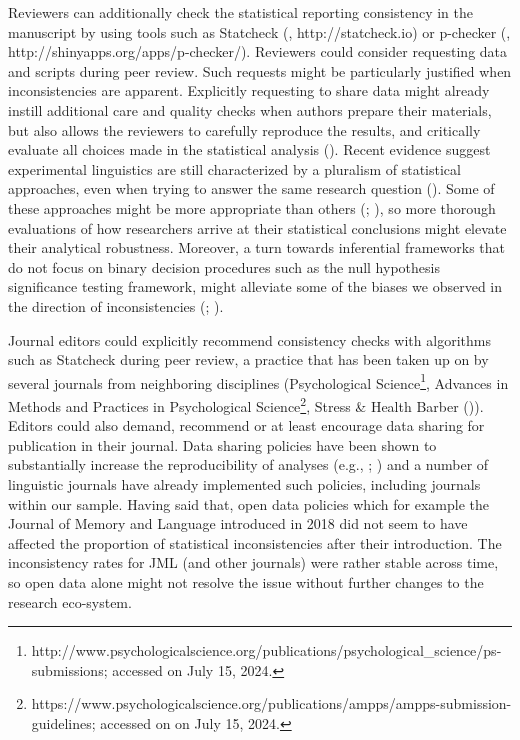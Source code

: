 \documentclass[
  doc,
  longtable,
  nolmodern,
  notxfonts,
  notimes,
  colorlinks=true,linkcolor=blue,citecolor=blue,urlcolor=blue]{apa7}
\begin{document}
Reviewers can additionally check the statistical reporting consistency
in the manuscript by using tools such as Statcheck
(,
http://statcheck.io) or p-checker
(,
http://shinyapps.org/apps/p-checker/). Reviewers could consider
requesting data and scripts during peer review. Such requests might be
particularly justified when inconsistencies are apparent. Explicitly
requesting to share data might already instill additional care and
quality checks when authors prepare their materials, but also allows the
reviewers to carefully reproduce the results, and critically evaluate
all choices made in the statistical analysis
(). Recent
evidence suggest experimental linguistics are still characterized by a
pluralism of statistical approaches, even when trying to answer the same
research question (). Some of these approaches might be more appropriate than
others (; ), so
more thorough evaluations of how researchers arrive at their statistical
conclusions might elevate their analytical robustness. Moreover, a turn
towards inferential frameworks that do not focus on binary decision
procedures such as the null hypothesis significance testing framework,
might alleviate some of the biases we observed in the direction of
inconsistencies (;
).

Journal editors could explicitly recommend consistency checks with
algorithms such as Statcheck during peer review, a practice that has
been taken up on by several journals from neighboring disciplines
(Psychological Science\footnote{http://www.psychologicalscience.org/publications/psychological\_science/ps-submissions;
  accessed on July 15, 2024.}, Advances in Methods and Practices in
Psychological Science\footnote{https://www.psychologicalscience.org/publications/ampps/ampps-submission-guidelines;
  accessed on on July 15, 2024.}, Stress \& Health Barber
()). Editors could also demand,
recommend or at least encourage data sharing for publication in their
journal. Data sharing policies have been shown to substantially increase
the reproducibility of analyses (e.g.,
;
)
and a number of linguistic journals have already implemented such
policies, including journals within our sample. Having said that, open
data policies which for example the Journal of Memory and Language
introduced in 2018 did not seem to have affected the proportion of
statistical inconsistencies after their introduction. The inconsistency
rates for JML (and other journals) were rather stable across time, so
open data alone might not resolve the issue without further changes to
the research eco-system.
\end{document}
